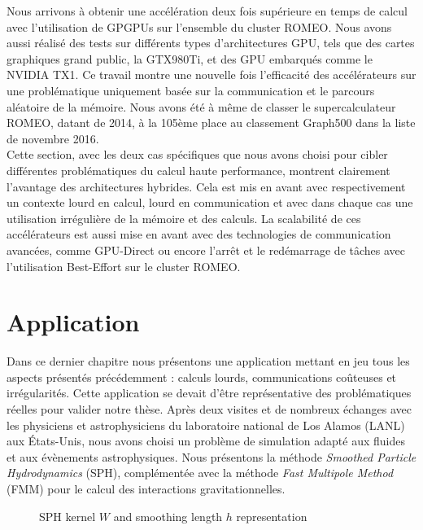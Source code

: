 \documentclass[12pt,a4paper]{report}
\newcommand{\locpath}{.}
\begin{document}
Nous arrivons à obtenir une accélération deux fois supérieure en temps de calcul avec l'utilisation de GPGPUs sur l'ensemble du cluster ROMEO. 
Nous avons aussi réalisé des tests sur différents types d'architectures GPU, tels que des cartes graphiques grand public, la GTX980Ti, et des GPU embarqués comme le NVIDIA TX1. 
Ce travail montre une nouvelle fois l'efficacité des accélérateurs sur une problématique uniquement basée sur la communication et le parcours aléatoire de la mémoire. 
Nous avons été à même de classer le supercalculateur ROMEO, datant de 2014, à la 105ème place au classement Graph500 dans la liste de novembre 2016. \\

Cette section, avec les deux cas spécifiques que nous avons choisi pour cibler différentes problématiques du calcul haute performance, montrent clairement l'avantage des architectures hybrides.
Cela est mis en avant avec respectivement un contexte lourd en calcul, lourd en communication et avec dans chaque cas une utilisation irrégulière de la mémoire et des calculs. 
La scalabilité de ces accélérateurs est aussi mise en avant avec des technologies de communication avancées, comme GPU-Direct ou encore l'arrêt et le redémarrage de tâches avec l'utilisation Best-Effort sur le cluster ROMEO. 

\section{Application}
Dans ce dernier chapitre nous présentons une application mettant en jeu tous les aspects présentés précédemment : calculs lourds, communications coûteuses et irrégularités.
Cette application se devait d'être représentative des problématiques réelles pour valider notre thèse. 
Après deux visites et de nombreux échanges avec les physiciens et astrophysiciens du laboratoire national de Los Alamos (LANL) aux États-Unis, nous avons choisi un problème de simulation adapté aux fluides et aux évènements astrophysiques. 
Nous présentons la méthode \textit{Smoothed Particle Hydrodynamics} (SPH), complémentée avec la méthode \textit{Fast Multipole Method} (FMM) pour le calcul des interactions gravitationnelles. 

\begin{figure}
\centering

\caption{SPH kernel $W$ and smoothing length $h$ representation}
\label{fig:sph_base}
\end{figure}
\end{document}
